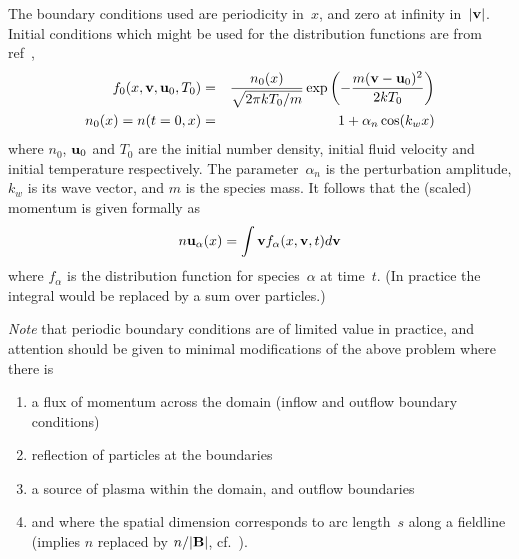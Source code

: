 The boundary conditions used are periodicity in~$x$, and zero at infinity in~$|{\bf v}|$.
Initial conditions which might be used for the distribution functions
are from ref~\cite{Ta13Deve},
\begin{eqnarray}
f_0(x,{\bf v},{\bf u}_0,T_0)&=& \frac{n_0(x)}{\sqrt{2\pi k T_0/m}}\exp\left(-\frac{m({\bf v}-{\bf u}_0)^2}{2kT_0}\right)  \label{eq:taitano3ics} \\
n_0(x)=n(t=0,x)&=&1 +\alpha_n \cos(k_w x ) \nonumber
\end{eqnarray}
where $n_0$, ${\bf u}_0$ and  $T_0$ are the 
initial number density, initial fluid velocity and initial temperature respectively. The
parameter~$\alpha_n$ is the perturbation amplitude, $k_w$ is its wave vector, and $m$ is the
species mass. It follows that the (scaled) momentum is given formally as
\begin{equation}\label{eq:mtmdefn}
n {\bf u}_\alpha(x) = \int {\bf v} f_\alpha (x,{\bf v},t) d{\bf v}
\end{equation}
where $f_\alpha$ is the distribution function for species~$\alpha$ at time~$t$.
(In practice the integral would be replaced by a sum over particles.)

\emph{Note} that periodic boundary conditions are of limited
value in practice, and attention should be given to minimal modifications
of the above  problem where there is
\begin{enumerate}
\item a flux of momentum across the domain (inflow
and outflow boundary conditions)
\item reflection of particles at the boundaries
\item a source of plasma within the domain, and outflow boundaries
\item and where the spatial dimension corresponds to arc length~$s$ along a fieldline
(implies $n$ replaced by $n/|{\bf B}|$, cf.\  ).
\end{enumerate}


